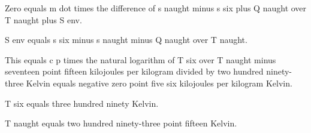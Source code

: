 Zero equals m dot times the difference of s naught minus s six plus Q naught over T naught plus S env.

S env equals s six minus s naught minus Q naught over T naught.

This equals c p times the natural logarithm of T six over T naught minus seventeen point fifteen kilojoules per kilogram divided by two hundred ninety-three Kelvin equals negative zero point five six kilojoules per kilogram Kelvin.

T six equals three hundred ninety Kelvin.

T naught equals two hundred ninety-three point fifteen Kelvin.